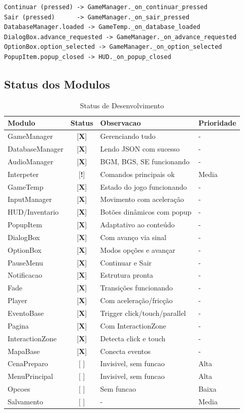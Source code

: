 \documentclass[12pt]{article}
\newcommand{\ok}{\textcolor{verde}{[\textbf{X}]}}
\newcommand{\pendente}{\textcolor{vermelho}{[\textbf{ }]}}
\newcommand{\parcial}{\textcolor{azul}{[\textbf{!}]}}
\begin{document}
\begin{verbatim}
Continuar (pressed) -> GameManager._on_continuar_pressed
Sair (pressed)      -> GameManager._on_sair_pressed
DatabaseManager.loaded -> GameTemp._on_database_loaded
DialogBox.advance_requested -> GameManager._on_advance_requested
OptionBox.option_selected -> GameManager._on_option_selected
PopupItem.popup_closed -> HUD._on_popup_closed
\end{verbatim}

\subsection{Status dos Modulos}

\begin{table}[H]
\centering
\small
\begin{tabular}{|l|c|p{5cm}|p{2.5cm}|}
\hline
\textbf{Modulo} & \textbf{Status} & \textbf{Observacao} & \textbf{Prioridade} \\
\hline
GameManager & \ok & Gerenciando tudo & - \\
DatabaseManager & \ok & Lendo JSON com sucesso & - \\
AudioManager & \ok & BGM, BGS, SE funcionando & - \\
Interpeter & \parcial & Comandos principais ok & Media \\
GameTemp & \ok & Estado do jogo funcionando & - \\
InputManager & \ok & Movimento com aceleração & - \\
HUD/Inventario & \ok & Botões dinâmicos com popup & - \\
PopupItem & \ok & Adaptativo ao conteúdo & - \\
DialogBox & \ok & Com avanço via sinal & - \\
OptionBox & \ok & Modos opções e avançar & - \\
PauseMenu & \ok & Continuar e Sair & - \\
Notificacao & \ok & Estrutura pronta & - \\
Fade & \ok & Transições funcionando & - \\
Player & \ok & Com aceleração/fricção & - \\
EventoBase & \ok & Trigger click/touch/parallel & - \\
Pagina & \ok & Com InteractionZone & - \\
InteractionZone & \ok & Detecta click e touch & - \\
MapaBase & \ok & Conecta eventos & - \\
\hline
CenaPreparo & \pendente & Invisivel, sem funcao & Alta \\
MenuPrincipal & \pendente & Invisivel, sem funcao & Alta \\
Opcoes & \pendente & Sem funcao & Baixa \\
Salvamento & \pendente & - & Media \\
\hline
\end{tabular}
\caption{Status de Desenvolvimento}
\end{table}
\end{document}
